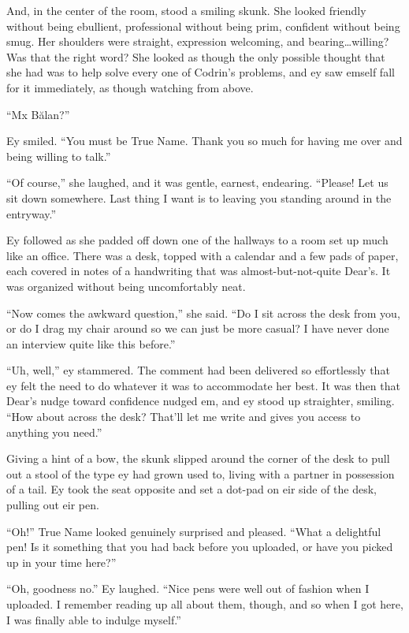 And, in the center of the room, stood a smiling skunk. She looked friendly without being ebullient, professional without being prim, confident without being smug. Her shoulders were straight, expression welcoming, and bearing\ldots willing? Was that the right word? She looked as though the only possible thought that she had was to help solve every one of Codrin's problems, and ey saw emself fall for it immediately, as though watching from above.

``Mx Bălan?''

Ey smiled. ``You must be True Name. Thank you so much for having me over and being willing to talk.''

``Of course,'' she laughed, and it was gentle, earnest, endearing. ``Please! Let us sit down somewhere. Last thing I want is to leaving you standing around in the entryway.''

Ey followed as she padded off down one of the hallways to a room set up much like an office. There was a desk, topped with a calendar and a few pads of paper, each covered in notes of a handwriting that was almost-but-not-quite Dear's. It was organized without being uncomfortably neat.

``Now comes the awkward question,'' she said. ``Do I sit across the desk from you, or do I drag my chair around so we can just be more casual? I have never done an interview quite like this before.''

``Uh, well,'' ey stammered. The comment had been delivered so effortlessly that ey felt the need to do whatever it was to accommodate her best. It was then that Dear's nudge toward confidence nudged em, and ey stood up straighter, smiling. ``How about across the desk? That'll let me write and gives you access to anything you need.''

Giving a hint of a bow, the skunk slipped around the corner of the desk to pull out a stool of the type ey had grown used to, living with a partner in possession of a tail. Ey took the seat opposite and set a dot-pad on eir side of the desk, pulling out eir pen.

``Oh!'' True Name looked genuinely surprised and pleased. ``What a delightful pen! Is it something that you had back before you uploaded, or have you picked up in your time here?''

``Oh, goodness no.'' Ey laughed. ``Nice pens were well out of fashion when I uploaded. I remember reading up all about them, though, and so when I got here, I was finally able to indulge myself.''

